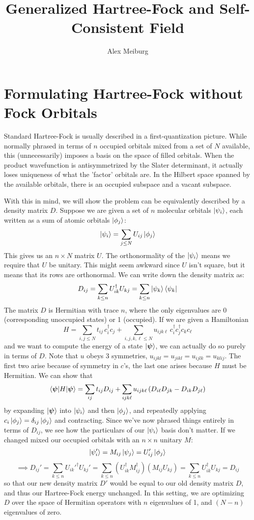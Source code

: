 \documentclass[a4paper,11pt]{article}
\title{Generalized Hartree-Fock and Self-Consistent Field}
\author{Alex Meiburg}
\newcommand{\9}{\,\,\,\,\,\,\,\,\,}
\begin{document}
\maketitle

\section{Formulating Hartree-Fock without Fock Orbitals}
Standard Hartree-Fock is usually described in a first-quantization picture. While normally phrased in terms of $n$ occupied orbitals mixed from a set of $N$ available, this (unnecessarily) imposes a basis on the space of filled orbitals. When the product wavefunction is antisymmetrized by the Slater determinant, it actually loses uniqueness of what the 'factor' orbitals are. In the Hilbert space spanned by the available orbitals, there is an occupied subspace and a vacant subspace.
\par With this in mind, we will show the problem can be equivalently described by a density matrix $D$. Suppose we are given a set of $n$ molecular orbitals $\ket{\psi_i}$, each written as a sum of atomic orbitals $\ket{\phi_j}$:
$$\ket{\psi_i} = \sum_{j\le N} U_{ij}\ket{\phi_j}$$
This gives us an $n\times N$ matrix $U$. The orthonormality of the $\ket{\psi_i}$ means we require that $U$ be unitary. This might seem awkward since $U$ isn't square, but it means that its rows are orthonormal. We can write down the density matrix as:
$$D_{ij} = \sum_{k\le n}U_{ik}^\dagger U_{kj} = \sum_{k\le n}\ket{\psi_k}\bra{\psi_k}$$
The matrix $D$ is Hermitian with trace $n$, where the only eigenvalues are 0 (corresponding unoccupied states) or 1 (occupied). If we are given a Hamiltonian
$$H = \sum_{i,j\le N} t_{ij}\,c^\dagger_i c_j + \sum_{i,j,k,\ell\le N} \!u_{ijk\ell}\, c^\dagger_i c^\dagger_j c_k c_\ell$$
and we want to compute the energy of a state $\ket{\bm \psi}$, we can actually do so purely in terms of $D$. Note that $u$ obeys 3 symmetries, $u_{ijkl} = u_{jikl} = u_{ijlk} = u_{klij}$. The first two arise because of symmetry in $c$'s, the last one arises because $H$ must be Hermitian. We can show that
$$\braket{\bm\psi|H|\bm\psi} = \sum_{ij} t_{ij}D_{ij} + \sum_{ijk\ell}u_{ijk\ell}\,(D_{i\ell}D_{jk}-D_{ik}D_{j\ell})$$
by expanding $\ket{\bm\psi}$ into $\ket{\psi_i}$ and then $\ket{\phi_j}$, and repeatedly applying $c_i\ket{\phi_j} = \delta_{ij}\ket{\phi_j}$ and contracting. Since we've now phrased things entirely in terms of $D_{ij}$, we see how the particulars of our $\ket{\psi_i}$ basis don't matter. If we changed mixed our occupied orbitals with an $n\times n$ unitary $M$:
$$\ket{\psi_i'} = M_{ij}\ket{\psi_j} = U_{ij}'\ket{\phi_j}$$
$$\implies D_{ij}' = \sum_{k\le n}U_{ik}'^\dagger U_{kj}' = \sum_{k\le n}(U_{ik}^\dagger M_{ij}^\dagger) (M_{ij}U_{kj}) = \sum_{k\le n}U_{ik}^\dagger U_{kj} = D_{ij}$$
so that our new density matrix $D'$ would be equal to our old density matrix $D$, and thus our Hartree-Fock energy unchanged. In this setting, we are optimizing $D$ over the space of Hermitian operators with $n$ eigenvalues of 1, and $(N-n)$ eigenvalues of zero.
\end{document}
